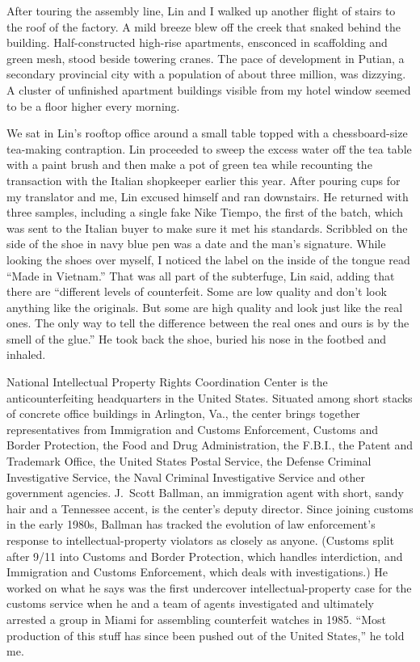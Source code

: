 ﻿\documentclass[12pt]{article}
\begin{document}
After touring the assembly line, Lin and I walked up another flight of stairs to the roof of the
factory. A mild breeze blew off the creek that snaked behind the building. Half-constructed
high-rise apartments, ensconced in scaffolding and green mesh, stood beside towering cranes. The
pace of development in Putian, a secondary provincial city with a population of about three million,
was dizzying. A cluster of unfinished apartment buildings visible from my hotel window seemed to be
a floor higher every morning.

We sat in Lin's rooftop office around a small table topped with a chessboard-size tea-making
contraption. Lin proceeded to sweep the excess water off the tea table with a paint brush and then
make a pot of green tea while recounting the transaction with the Italian shopkeeper earlier this
year. After pouring cups for my translator and me, Lin excused himself and ran downstairs. He
returned with three samples, including a single fake Nike Tiempo, the first of the batch, which was
sent to the Italian buyer to make sure it met his standards. Scribbled on the side of the shoe in
navy blue pen was a date and the man's signature. While looking the shoes over myself, I noticed the
label on the inside of the tongue read ``Made in Vietnam.'' That was all part of the subterfuge, Lin
said, adding that there are ``different levels of counterfeit. Some are low quality and don't look
anything like the originals. But some are high quality and look just like the real ones. The only
way to tell the difference between the real ones and ours is by the smell of the glue.'' He took
back the shoe, buried his nose in the footbed and inhaled.

National Intellectual Property Rights Coordination Center is the anticounterfeiting headquarters in
the United States. Situated among short stacks of concrete office buildings in Arlington, Va., the
center brings together representatives from Immigration and Customs Enforcement, Customs and Border
Protection, the Food and Drug Administration, the F.B.I., the Patent and Trademark Office, the
United States Postal Service, the Defense Criminal Investigative Service, the Naval Criminal
Investigative Service and other government agencies. J.~Scott Ballman, an immigration agent with
short, sandy hair and a Tennessee accent, is the center's deputy director. Since joining customs in
the early 1980s, Ballman has tracked the evolution of law enforcement's response to
intellectual-property violators as closely as anyone. (Customs split after 9/11 into Customs and
Border Protection, which handles interdiction, and Immigration and Customs Enforcement, which deals
with investigations.) He worked on what he says was the first undercover intellectual-property case
for the customs service when he and a team of agents investigated and ultimately arrested a group in
Miami for assembling counterfeit watches in 1985. ``Most production of this stuff has since been
pushed out of the United States,'' he told me.
\end{document}
